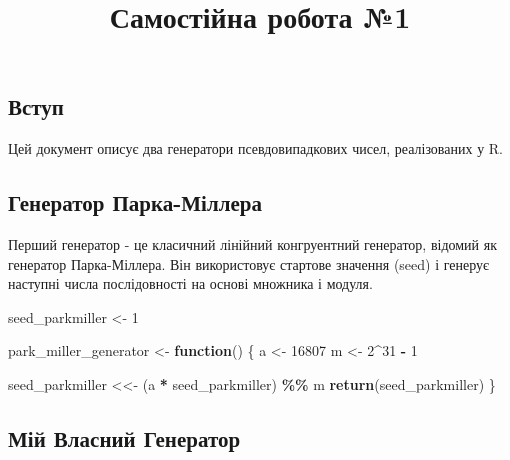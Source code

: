 \documentclass[
]{article}
\title{Самостійна робота №1}
\author{}
\date{\vspace{-2.5em}}
\newenvironment{Shaded}{\begin{snugshade}}{\end{snugshade}}
\newcommand{\ControlFlowTok}[1]{\textcolor[rgb]{0.13,0.29,0.53}{\textbf{#1}}}
\newcommand{\DecValTok}[1]{\textcolor[rgb]{0.00,0.00,0.81}{#1}}
\newcommand{\FunctionTok}[1]{\textcolor[rgb]{0.13,0.29,0.53}{\textbf{#1}}}
\newcommand{\NormalTok}[1]{#1}
\newcommand{\OtherTok}[1]{\textcolor[rgb]{0.56,0.35,0.01}{#1}}
\newcommand{\SpecialCharTok}[1]{\textcolor[rgb]{0.81,0.36,0.00}{\textbf{#1}}}
\begin{document}
\maketitle

\hypertarget{ux432ux441ux442ux443ux43f}{%
\subsection{Вступ}\label{ux432ux441ux442ux443ux43f}}

Цей документ описує два генератори псевдовипадкових чисел, реалізованих
у R.

\hypertarget{ux433ux435ux43dux435ux440ux430ux442ux43eux440-ux43fux430ux440ux43aux430-ux43cux456ux43bux43bux435ux440ux430}{%
\subsection{Генератор
Парка-Міллера}\label{ux433ux435ux43dux435ux440ux430ux442ux43eux440-ux43fux430ux440ux43aux430-ux43cux456ux43bux43bux435ux440ux430}}

Перший генератор - це класичний лінійний конгруентний генератор, відомий
як генератор Парка-Міллера. Він використовує стартове значення (seed) і
генерує наступні числа послідовності на основі множника і модуля.

\begin{Shaded}
\begin{Highlighting}[]
\NormalTok{seed\_parkmiller }\OtherTok{\textless{}{-}} \DecValTok{1}

\NormalTok{park\_miller\_generator }\OtherTok{\textless{}{-}} \ControlFlowTok{function}\NormalTok{() \{}
\NormalTok{  a }\OtherTok{\textless{}{-}} \DecValTok{16807}
\NormalTok{  m }\OtherTok{\textless{}{-}} \DecValTok{2}\SpecialCharTok{\^{}}\DecValTok{31} \SpecialCharTok{{-}} \DecValTok{1}
  
\NormalTok{  seed\_parkmiller }\OtherTok{\textless{}\textless{}{-}}\NormalTok{ (a }\SpecialCharTok{*}\NormalTok{ seed\_parkmiller) }\SpecialCharTok{\%\%}\NormalTok{ m}
  \FunctionTok{return}\NormalTok{(seed\_parkmiller)}
\NormalTok{\}}
\end{Highlighting}
\end{Shaded}

\hypertarget{ux43cux456ux439-ux432ux43bux430ux441ux43dux438ux439-ux433ux435ux43dux435ux440ux430ux442ux43eux440}{%
\subsection{Мій Власний
Генератор}\label{ux43cux456ux439-ux432ux43bux430ux441ux43dux438ux439-ux433ux435ux43dux435ux440ux430ux442ux43eux440}}
\end{document}
